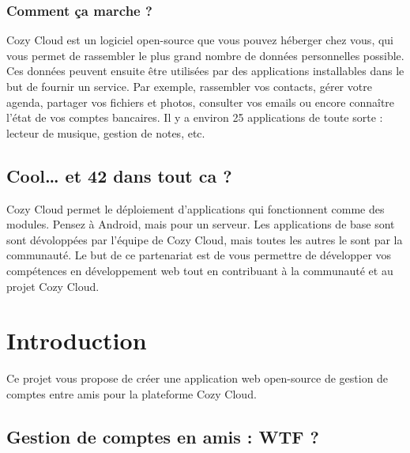 \documentclass{42-fr}
\begin{document}
		\subsection{Comment ça marche ?}

			Cozy Cloud est un logiciel open-source que vous pouvez h\'eberger chez vous,
			qui vous permet de rassembler le plus grand nombre de donn\'ees
			personnelles possible. Ces donn\'ees peuvent ensuite \^etre utilis\'ees par des
			applications installables dans le but de fournir un service. Par exemple,
			rassembler vos contacts, g\'erer votre agenda, partager vos fichiers et
			photos, consulter vos emails ou encore conna\^itre l'\'etat de vos comptes
			bancaires. Il y a environ 25 applications de toute sorte : lecteur de musique,
			gestion de notes, etc.

	\section{Cool… et 42 dans tout ca ?}

		Cozy Cloud permet le d\'eploiement d'applications qui fonctionnent comme
		des modules. Pensez \`a Android, mais pour un serveur. Les applications de
		base sont sont d\'evolopp\'ees par l'\'equipe de Cozy Cloud, mais toutes
		les autres le sont par la communaut\'e. Le but de ce partenariat est de vous
		permettre de d\'evelopper vos comp\'etences en d\'eveloppement web tout
		en contribuant \`a la communaut\'e et au projet Cozy Cloud.


\chapter{Introduction}

	Ce projet vous propose de cr\'eer une application web open-source de gestion de
	comptes entre amis pour la plateforme Cozy Cloud.

	\section{Gestion de comptes en amis : WTF ?}
\end{document}
